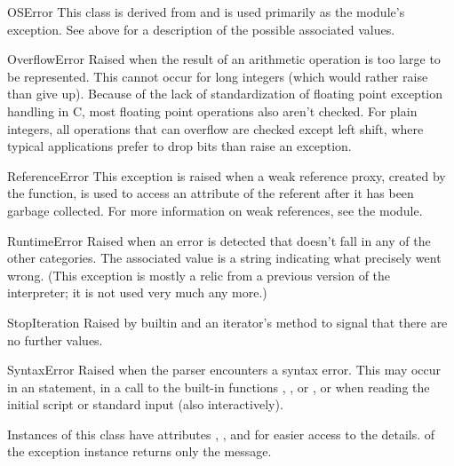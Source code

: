 \begin{excdesc}{OSError}
  This class is derived from  and is used
  primarily as the  module's  exception.
  See  above for a description of the
  possible associated values.
\end{excdesc}

\begin{excdesc}{OverflowError}
  Raised when the result of an arithmetic operation is too large to be
  represented.  This cannot occur for long integers (which would rather
  raise  than give up).  Because of the lack of
  standardization of floating point exception handling in C, most
  floating point operations also aren't checked.  For plain integers,
  all operations that can overflow are checked except left shift, where
  typical applications prefer to drop bits than raise an exception.
\end{excdesc}

\begin{excdesc}{ReferenceError}
  This exception is raised when a weak reference proxy, created by the
   function, is used to access
  an attribute of the referent after it has been garbage collected.
  For more information on weak references, see the 
  module.
\end{excdesc}

\begin{excdesc}{RuntimeError}
  Raised when an error is detected that doesn't fall in any of the
  other categories.  The associated value is a string indicating what
  precisely went wrong.  (This exception is mostly a relic from a
  previous version of the interpreter; it is not used very much any
  more.)
\end{excdesc}

\begin{excdesc}{StopIteration}
  Raised by builtin  and an iterator's 
  method to signal that there are no further values.
\end{excdesc}


\begin{excdesc}{SyntaxError}
  Raised when the parser encounters a syntax error.  This may occur in
  an  statement, in a call to the built-in functions
  , ,  or
  , or when reading the initial script or standard
  input (also interactively).

  Instances of this class have attributes ,
  ,  and  for easier access
  to the details.   of the exception instance returns
  only the message.
\end{excdesc}

